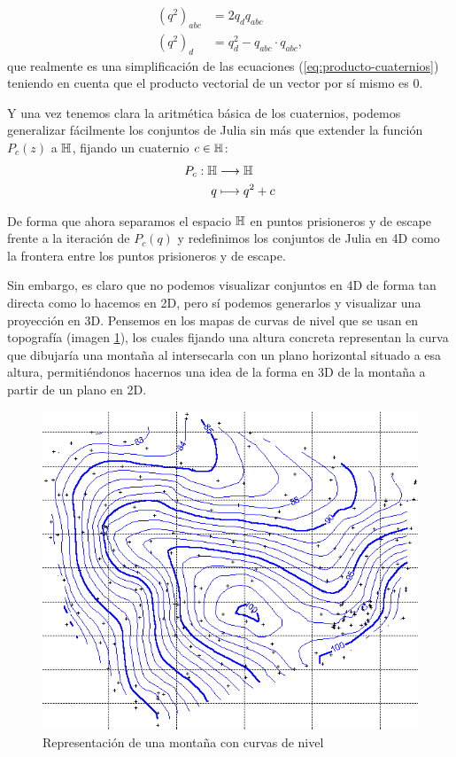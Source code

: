 \begin{equation}
    \label{eq:cuadrado-cuaternio}
    \begin{split}
        (q^2)_{abc} &= 2q_d q_{abc} \\
        (q^2)_d &= q_d^2 - q_{abc}\cdot q_{abc},
    \end{split}
\end{equation}
que realmente es una simplificación de las ecuaciones (\ref{eq:producto-cuaternios}) teniendo en cuenta que el producto vectorial de un vector por sí mismo es $0$.

Y una vez tenemos clara la aritmética básica de los cuaternios, podemos generalizar fácilmente los conjuntos de Julia sin más que extender la función $P_c(z)$ a $\mathbb{H}$, fijando un cuaternio $c\in\mathbb{H}$:
\begin{equation}
    \label{eq:f-julia-cuaternios}
    \begin{split}
        P_c : \mathbb{H} & \longrightarrow \mathbb{H} \\
        q & \longmapsto q^2 + c
    \end{split}
\end{equation}

De forma que ahora separamos el espacio $\mathbb{H}$ en puntos prisioneros y de escape frente a la iteración de $P_c(q)$ y redefinimos los conjuntos de Julia en 4D como la frontera entre los puntos prisioneros y de escape. 

Sin embargo, es claro que no podemos visualizar conjuntos en 4D de forma tan directa como lo hacemos en 2D, pero sí podemos generarlos y visualizar una proyección en 3D. Pensemos en los mapas de curvas de nivel que se usan en topografía (imagen \ref{fig:curva-de-nivel}), los cuales fijando una altura concreta representan la curva que dibujaría una montaña al intersecarla con un plano horizontal situado a esa altura, permitiéndonos hacernos una idea de la forma en 3D de la montaña a partir de un plano en 2D. 

\begin{figure} [ht]
    \centering
    \includegraphics[scale = 0.3]{img/C8/curvas-de-nivel2.png}
    \caption{Representación de una montaña con curvas de nivel}
    \label{fig:curva-de-nivel}
\end{figure}

